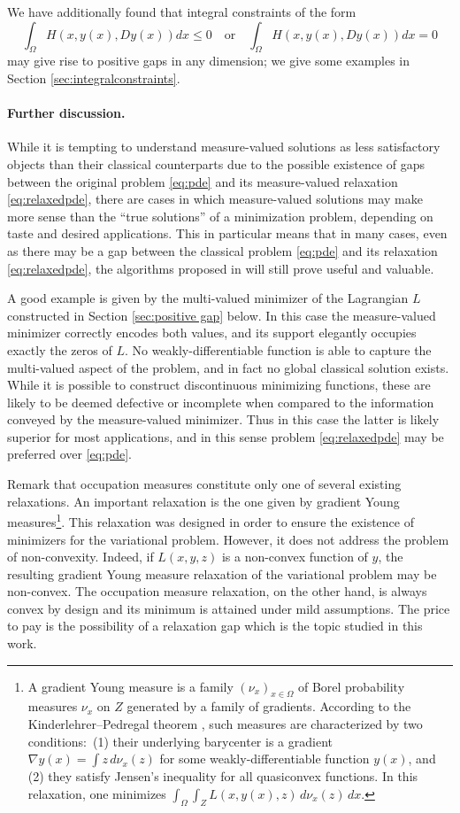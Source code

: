 \documentclass{article}
\theoremstyle{definition}
\theoremstyle{remark}
\begin{document}
We have additionally found that integral constraints of the form 
\[\int_{\Omega}H(x,y(x),Dy(x))dx\leq 0\quad \textrm{or}\quad \int_{\Omega}H(x,y(x),Dy(x))dx= 0\] may give rise to positive gaps in any dimension; we give some examples in Section \ref{sec:integralconstraints}.

\paragraph{Further discussion.}
While it is tempting to understand measure-valued solutions as less satisfactory objects than their classical counterparts due to the possible existence of gaps between the original problem \ref{eq:pde} and its measure-valued relaxation \ref{eq:relaxedpde}, there are cases in which measure-valued solutions may make more sense than the ``true solutions'' of a minimization problem, depending on taste and desired applications. This in particular means that in many cases, even as there may be a gap between the classical problem \eqref{eq:pde} and its relaxation \eqref{eq:relaxedpde}, the algorithms proposed in \cite{korda2018moments} will still prove useful and valuable. 

A good example is given by the multi-valued minimizer of the Lagrangian $L$ constructed in Section \ref{sec:positive gap} below. In this case  the measure-valued minimizer correctly encodes both values, and its support elegantly occupies exactly the zeros of $L$. No weakly-differentiable function is able to capture the multi-valued aspect of the problem, and in fact no global classical solution exists. While it is possible to construct discontinuous minimizing functions, these are likely to be deemed defective or incomplete when compared to the information conveyed by the measure-valued minimizer. Thus in this case the latter is likely superior for most applications, and in this sense problem \eqref{eq:relaxedpde} may  be preferred over \eqref{eq:pde}.

%
%
%
%
{Remark that occupation measures constitute only one of several existing relaxations. An important relaxation is the one given by gradient Young measures\footnote{{A gradient Young measure is a family $(\nu_x)_{x\in\Omega}$ of Borel probability measures $\nu_x$ on $Z$ generated by a family of gradients. According to the Kinderlehrer--Pedregal theorem \cite{kinderlehrerpedregal}, such measures are characterized by two conditions:~(1) their underlying barycenter is a gradient $\nabla y(x)=\int z\,d\nu_x(z)$ for some weakly-differentiable function $y(x)$, and (2) they satisfy Jensen's inequality for all quasiconvex functions. In this relaxation, one minimizes $\int_\Omega \int_ZL(x,y(x),z)\,d\nu_x(z)\,dx$.}}.
This relaxation was designed in order to ensure the existence of minimizers for the variational problem. However, it does not address the problem of non-convexity. Indeed, if $L(x,y,z)$ is a non-convex function of $y$, the resulting gradient Young measure relaxation of the variational problem may be non-convex. The occupation measure relaxation, on the other hand, is always convex by design and its minimum is attained under mild assumptions. The price to pay is the possibility of a relaxation gap which is the topic studied in this work.}
%
%
%
%
%
\end{document}
